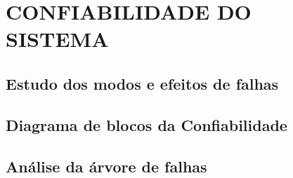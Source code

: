 \chapter{CONFIABILIDADE DO SISTEMA}
\label{chap:conf}

\section{Estudo dos modos e efeitos de falhas}
\label{sec:fmeca}

\section{Diagrama de blocos da Confiabilidade}
\label{sec:diag}

\section{Análise da árvore de falhas}
\label{sec:fta}

